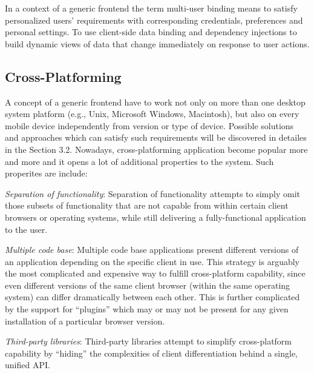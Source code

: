 	In a context of a generic frontend the term multi-user binding means to satisfy personalized users' requirements with corresponding credentials, preferences and personal settings. To use client-side data binding and dependency injections to build dynamic views of data that change immediately on response to user actions.

\subsection {Cross-Platforming}
    A concept of a generic frontend have to work not only on more than one desktop system platform (e.g., Unix, Microsoft Windows, Macintosh), but also on every mobile device independently from version or type of device. Possible solutions and approaches which can satisfy such requirements will be discovered in detailes in the Section 3.2. Nowadays, cross-platforming application become popular more and more and it opens a lot of additional properties to the system. Such properites are include:

	\emph{Separation of functionality}:	Separation of functionality attempts to simply omit those subsets of functionality that are not capable from within certain client browsers or operating systems, while still delivering a fully-functional application to the user.

	\emph{Multiple code base}: Multiple code base applications present different versions of an application depending on the specific client in use. This strategy is arguably the most complicated and expensive way to fulfill cross-platform capability, since even different versions of the same client browser (within the same operating system) can differ dramatically between each other. This is further complicated by the support for ``plugins'' which may or may not be present for any given installation of a particular browser version.

	\emph{Third-party libraries}: Third-party libraries attempt to simplify cross-platform capability by ``hiding'' the complexities of client differentiation behind a single, unified API.

